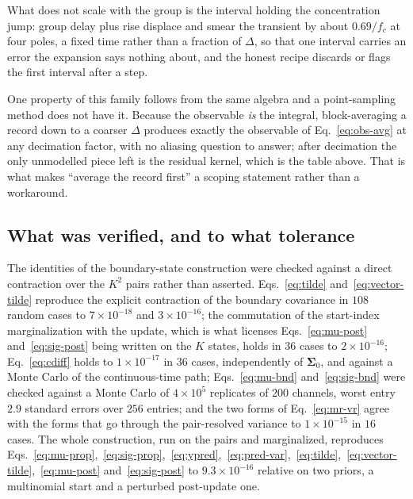 \begin{appendixbox}
What does not scale with the group is the interval holding the concentration jump: group delay plus
rise displace and smear the transient by about $0.69/f_c$ at four poles, a fixed time rather than a
fraction of $\Delta$, so that one interval carries an error the expansion says nothing about, and
the honest recipe discards or flags the first interval after a step.

One property of this family follows from the same algebra and a point-sampling method does not have
it. Because the observable \emph{is} the integral, block-averaging a record down to a coarser
$\Delta$ produces exactly the observable of Eq.~\ref{eq:obs-avg} at any decimation factor, with no
aliasing question to answer; after decimation the only unmodelled piece left is the residual kernel,
which is the table above. That is what makes ``average the record first'' a scoping statement rather
than a workaround.

\subsection*{What was verified, and to what tolerance}

 The identities of the boundary-state construction were checked
against a direct contraction over the $K^2$ pairs rather than asserted. Eqs.~\ref{eq:tilde}
and~\ref{eq:vector-tilde} reproduce the explicit contraction of the boundary covariance in $108$
random cases to $7\times10^{-18}$ and $3\times10^{-16}$; the commutation of the start-index
marginalization with the update, which is what licenses Eqs.~\ref{eq:mu-post}
and~\ref{eq:sig-post} being written on the $K$ states, holds in $36$ cases to $2\times10^{-16}$;
Eq.~\ref{eq:cdiff} holds to $1\times10^{-17}$ in $36$ cases, independently of $\bm{\Sigma}_0$, and
against a Monte Carlo of the continuous-time path; Eqs.~\ref{eq:mu-bnd} and~\ref{eq:sig-bnd} were
checked against a Monte Carlo of $4\times10^{5}$ replicates of $200$ channels, worst entry $2.9$
standard errors over $256$ entries; and the two forms of Eq.~\ref{eq:mr-vr} agree with the forms
that go through the pair-resolved variance to $1\times10^{-15}$ in $16$ cases. The whole
construction, run on the pairs and marginalized, reproduces
Eqs.~\ref{eq:mu-prop},~\ref{eq:sig-prop},~\ref{eq:ypred},~\ref{eq:pred-var},~\ref{eq:tilde},~\ref{eq:vector-tilde},~\ref{eq:mu-post}
and~\ref{eq:sig-post} to $9.3\times10^{-16}$ relative on two priors, a multinomial start and a
perturbed post-update one.

\end{appendixbox}
